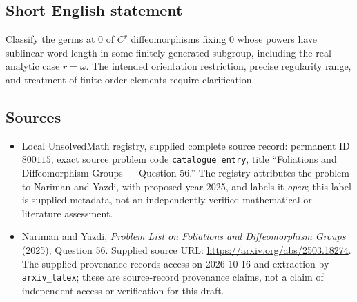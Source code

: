 \documentclass[11pt]{article}
\begin{document}
\subsection{Short English statement}
Classify the germs at \(0\) of \(C^r\) diffeomorphisms fixing \(0\) whose powers have sublinear word length in some finitely generated subgroup, including the real-analytic case \(r=\omega\). The intended orientation restriction, precise regularity range, and treatment of finite-order elements require clarification.
\subsection{Sources}
\begin{itemize}
\item Local UnsolvedMath registry, supplied complete source record: permanent ID \(800115\), exact source problem code \texttt{catalogue entry}, title ``Foliations and Diffeomorphism Groups --- Question 56.'' The registry attributes the problem to Nariman and Yazdi, with proposed year 2025, and labels it \emph{open}; this label is supplied metadata, not an independently verified mathematical or literature assessment.
\item Nariman and Yazdi, \emph{Problem List on Foliations and Diffeomorphism Groups} (2025), Question 56. Supplied source URL: \url{https://arxiv.org/abs/2503.18274}. The supplied provenance records access on 2026-10-16 and extraction by \texttt{arxiv\_latex}; these are source-record provenance claims, not a claim of independent access or verification for this draft.
\end{itemize}
\end{document}
